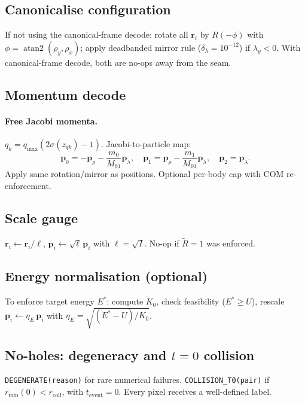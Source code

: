 \documentclass[11pt]{report}
\DeclareMathOperator{\atanTwo}{atan2}
\begin{document}
\subsection{Canonicalise configuration}
\label{sec:canon_config}

If not using the canonical-frame decode: rotate all $\mathbf r_i$ by $R(-\phi)$ with $\phi=\atanTwo(\rho_y,\rho_x)$; apply deadbanded mirror rule ($\delta_\lambda=10^{-12}$) if $\lambda_y<0$. With canonical-frame decode, both are no-ops away from the seam.

\subsection{Momentum decode}
\label{sec:jacobi_mom}

\paragraph{Free Jacobi momenta.} $q_k = q_{\max}(2\sigma(z_{qk})-1)$. Jacobi-to-particle map:
\[
\mathbf p_0=-\mathbf p_\rho - \frac{m_0}{M_{01}}\mathbf p_\lambda,\quad \mathbf p_1=\mathbf p_\rho - \frac{m_1}{M_{01}}\mathbf p_\lambda,\quad \mathbf p_2=\mathbf p_\lambda.
\]
Apply same rotation/mirror as positions. Optional per-body cap with COM re-enforcement.

\subsection{Scale gauge}
\label{sec:scale_gauge}

$\mathbf r_i \leftarrow \mathbf r_i/\ell$, $\mathbf p_i \leftarrow \sqrt\ell\,\mathbf p_i$ with $\ell=\sqrt{I}$. No-op if $\tilde R=1$ was enforced.

\subsection{Energy normalisation (optional)}
\label{sec:energy_norm}

To enforce target energy $E^*$: compute $K_0$, check feasibility ($E^*\ge U$), rescale $\mathbf p_i \leftarrow \eta_E\,\mathbf p_i$ with $\eta_E = \sqrt{(E^*-U)/K_0}$.

\subsection{No-holes: degeneracy and $t=0$ collision}
\label{sec:no_holes_impl}

\texttt{DEGENERATE(reason)} for rare numerical failures. \texttt{COLLISION\_T0(pair)} if $r_{\min}(0)<r_{\text{coll}}$, with $t_{\text{event}}=0$. Every pixel receives a well-defined label.
\end{document}
